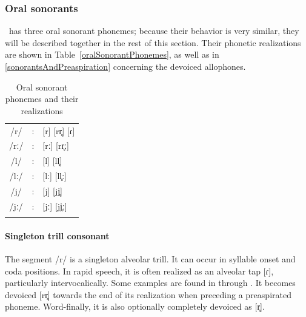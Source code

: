 \subsubsection{Oral sonorants}\label{oralSonorants}%
\PS\ has three oral sonorant phonemes; %
because their behavior is very similar, they will be described together in the rest of this section. 
Their phonetic realizations are shown in Table~\vref{oralSonorantPhonemes}, as well as in \SEC\ref{sonorantsAndPreaspiration} concerning the devoiced allophones. 
\begin{table}[ht]\centering
\caption{Oral sonorant phonemes and their realizations}\label{oralSonorantPhonemes}%
\begin{tabular}{c c l}\mytoprule
/r/ &:& [r] [rr̥] [ɾ]\\ %
/rː/ &:& [rː] [rr̥ː] \\ %
/l/ &:& [l] [ll̥]\\ %
/lː/ &:& [lː] [ll̥ː]\\ %
/j/ &:& [j] [jj̥] \\ %
/jː/ &:& [jː] [jj̥ː] \\ %
\mybottomrule
\end{tabular}
\end{table}


\paragraph{Singleton trill consonant}
The segment /r/ is a singleton alveolar trill. It can occur in syllable onset and coda positions. %
In rapid speech, it is often realized as an alveolar tap [ɾ], particularly intervocalically. Some examples are found in  through . It becomes devoiced [rr̥] towards the end of its realization when preceding a preaspirated phoneme. 
Word-finally, it is also optionally completely devoiced as [r̥].%

